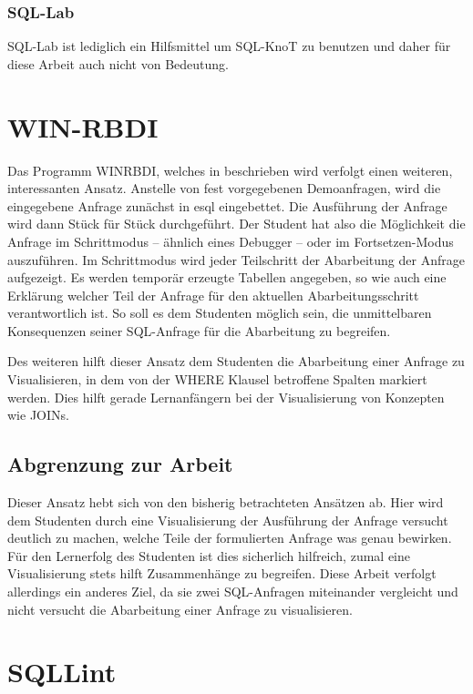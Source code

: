 \subsubsection{SQL-Lab}

SQL-Lab ist lediglich ein Hilfsmittel um SQL-KnoT zu benutzen und daher für diese Arbeit auch nicht von Bedeutung. 

\section{WIN-RBDI}

Das Programm WINRBDI, welches in \cite{winrbdi1} beschrieben wird verfolgt einen weiteren, interessanten Ansatz. Anstelle von fest vorgegebenen Demoanfragen, wird die eingegebene Anfrage zunächst in esql eingebettet. Die Ausführung der Anfrage wird dann Stück für Stück durchgeführt. Der Student hat also die Möglichkeit die Anfrage im Schrittmodus -- ähnlich eines Debugger -- oder im Fortsetzen-Modus auszuführen. Im Schrittmodus wird jeder Teilschritt der Abarbeitung der Anfrage aufgezeigt. Es werden temporär erzeugte Tabellen angegeben, so wie auch eine Erklärung welcher Teil der Anfrage für den aktuellen Abarbeitungsschritt verantwortlich ist. So soll es dem Studenten möglich sein, die unmittelbaren Konsequenzen seiner SQL-Anfrage für die Abarbeitung zu begreifen. 

Des weiteren hilft dieser Ansatz dem Studenten die Abarbeitung einer Anfrage zu Visualisieren, in dem von der WHERE Klausel betroffene Spalten markiert werden. Dies hilft gerade Lernanfängern bei der Visualisierung von Konzepten wie JOINs.

\subsection*{Abgrenzung zur Arbeit}

Dieser Ansatz hebt sich von den bisherig betrachteten Ansätzen ab. Hier wird dem Studenten durch eine Visualisierung der Ausführung der Anfrage versucht deutlich zu machen, welche Teile der formulierten Anfrage was genau bewirken. Für den Lernerfolg des Studenten ist dies sicherlich hilfreich, zumal eine Visualisierung stets hilft Zusammenhänge zu begreifen. Diese Arbeit verfolgt allerdings ein anderes Ziel, da sie zwei SQL-Anfragen miteinander vergleicht und nicht versucht die Abarbeitung einer Anfrage zu visualisieren.

\section{SQLLint}

